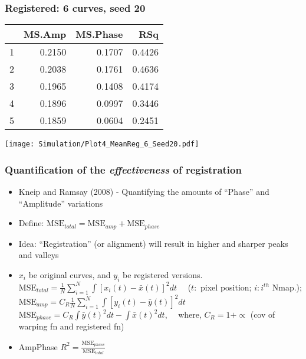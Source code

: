 \documentclass[10pt,dvipsnames,table]{beamer}
\begin{document}
\begin{frame}
\frametitle{Registered: 6 curves, seed 20}

\begin{table}[ht]
\footnotesize
\centering
\begin{tabular}{rrrr}
  \hline
 & MS.Amp & MS.Phase & RSq \\ 
  \hline
1 & 0.2150 & 0.1707 & 0.4426 \\ 
  2 & 0.2038 & 0.1761 & 0.4636 \\ 
  3 & 0.1965 & 0.1408 & 0.4174 \\ 
  4 & 0.1896 & 0.0997 & 0.3446 \\ 
  5 & 0.1859 & 0.0604 & 0.2451 \\ 
   \hline
\end{tabular}
\end{table}

\begin{center}
\texttt{[image: Simulation/Plot4\_MeanReg\_6\_Seed20.pdf]} 
\end{center}
\end{frame}

\begin{frame}
\frametitle{Quantification of the {\emph{effectiveness}} of registration}
\begin{itemize}
\item Kneip and Ramsay (2008) - Quantifying the amounts of ``Phase'' and ``Amplitude'' variations
\item Define: $\text{MSE}_{total} = \text{MSE}_{amp} + \text{MSE}_{phase}$
\item Idea: ``Registration'' (or alignment) will result in higher and sharper peaks and valleys
\item $x_i$ be original curves, and $y_i$ be registered versions. $\text{MSE}_{total} = \frac{1}{N}\sum\limits_{i=1}^{N}\int[x_i(t) - \bar{x}(t)]^2dt$ \ \ {\footnotesize{($t:$ pixel position; $i: i^{th}$ Nmap.)}}; 
$\text{MSE}_{amp} = C_R\frac{1}{N}\sum\limits_{i=1}^{N}\int[y_i(t) - \bar{y}(t)]^2dt$ \\
$\text{MSE}_{phase} = C_R\int \bar{y}(t)^2 dt - \int \bar{x}(t)^2 dt$, \ \ where, $C_R = 1 + \propto $ (cov of warping fn and registered fn)

\item AmpPhase $R^2 = \frac{\text{MSE}_{phase}}{\text{MSE}_{total}}$
\end{itemize}
\end{frame}
\end{document}

